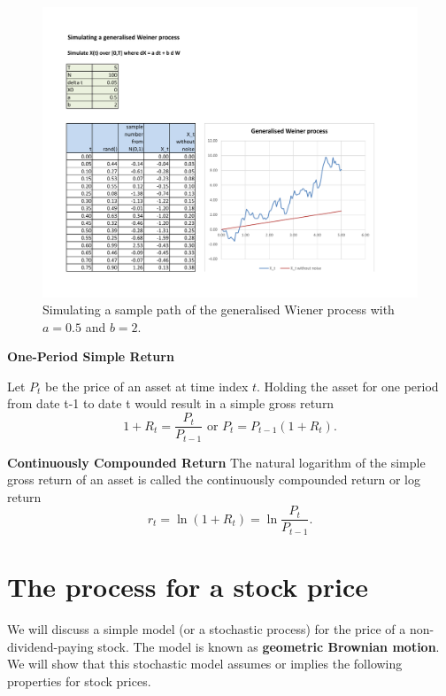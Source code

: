 \documentclass[
]{book}
\theoremstyle{definition}
\theoremstyle{definition}
\theoremstyle{definition}
\theoremstyle{definition}
\theoremstyle{remark}
\begin{document}
\begin{figure}
\hypertarget{fig:GW}{%
\centering
\includegraphics[width=8in,height=\textheight]{GW2.pdf}
\caption{Simulating a sample path of the generalised Wiener process with
\(a =0.5\) and \(b = 2\).}\label{fig:GW}
}
\end{figure}

\textbf{One-Period Simple Return}

Let \(P_t\) be the price of an asset at time index \(t\). Holding the asset
for one period from date t-1 to date t would result in a simple gross
return
\[1 + R_t =  \frac{P_t}{P_{t-1}}   \text{    or     }    P_t = P_{t-1} (1 + R_t).\]

\textbf{Continuously Compounded Return} The natural logarithm of the simple
gross return of an asset is called the continuously compounded return or
log return \[r_t = \ln(1 + R_t) = \ln\frac{P_t}{P_{t-1}}.\]

\hypertarget{the-process-for-a-stock-price}{%
\section{The process for a stock price}\label{the-process-for-a-stock-price}}

We will discuss a simple model (or a stochastic process) for the price
of a non-dividend-paying stock. The model is known as \textbf{geometric
Brownian motion}. We will show that this stochastic model assumes or
implies the following properties for stock prices.
\end{document}
